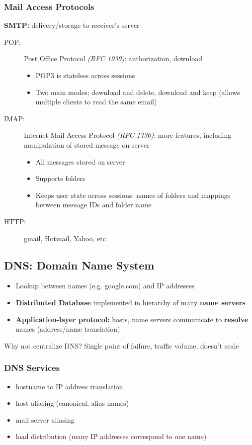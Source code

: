 \subsubsection{Mail Access Protocols}
\begin{leftbar}
	\textbf{SMTP:} delivery/storage to receiver's server
\end{leftbar}
\begin{description}
	\item[POP:] Post Office Protocol \textit{(RFC 1939)}: authorization, download
	\begin{itemize}
		\item POP3 is stateless across sessions
		\item Two main modes; download and delete, download and keep (allows multiple clients to read the same email)
	\end{itemize}
	\item[IMAP:] Internet Mail Access Protocol \textit{(RFC 1730)}: more features, including manipulation of stored message on server
	\begin{itemize}
		\item All messages stored on server
		\item Supports folders
		\item Keeps user state across sessions: names of folders and mappings between message IDs and folder name
	\end{itemize}
	\item[HTTP:] gmail, Hotmail, Yahoo, etc
\end{description}

\subsection{DNS: Domain Name System}\label{sec:dns}
\begin{itemize}
	\item Lookup between names (e.g. google.com) and IP addresses
	\item \textbf{Distributed Database} implemented in hierarchy of many \textbf{name servers}
	\item \textbf{Application-layer protocol:} hosts, name servers communicate to \textbf{resolve} names (address/name translation)
\end{itemize}
Why not centralize DNS? Single point of failure, traffic volume, doesn't scale
\subsubsection{DNS Services}
\begin{itemize}
	\item hostname to IP address translation
	\item host aliasing (canonical, alias names)
	\item mail server aliasing
	\item load distribution (many IP addresses correspond to one name)
\end{itemize}
